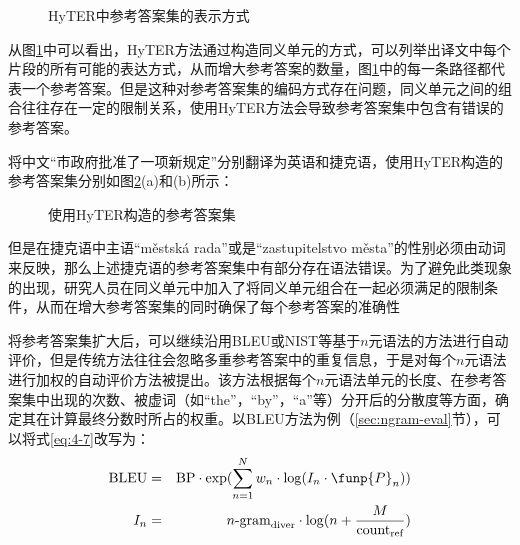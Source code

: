 \begin{figure}[htp]
    \centering
	
   \caption{HyTER中参考答案集的表示方式}
   \label{fig:4-7}
\end{figure}

\parinterval 从图\ref{fig:4-7}中可以看出，HyTER方法通过构造同义单元的方式，可以列举出译文中每个片段的所有可能的表达方式，从而增大参考答案的数量，图\ref{fig:4-7}中的每一条路径都代表一个参考答案。但是这种对参考答案集的编码方式存在问题，同义单元之间的组合往往存在一定的限制关系，使用HyTER方法会导致参考答案集中包含有错误的参考答案。

\begin{example}
将中文“市政府批准了一项新规定”分别翻译为英语和捷克语，使用HyTER构造的参考答案集分别如图\ref{fig:4-8}(a)和(b)所示：
\label{eg:4-6}
\end{example}

\begin{figure}[htp]
    \centering
{}
   \caption{使用HyTER构造的参考答案集}
   \label{fig:4-8}
\end{figure}

\parinterval 但是在捷克语中主语“městská rada”或是“zastupitelstvo města”的性别必须由动词来反映，那么上述捷克语的参考答案集中有部分存在语法错误。为了避免此类现象的出现，研究人员在同义单元中加入了将同义单元组合在一起必须满足的限制条件，从而在增大参考答案集的同时确保了每个参考答案的准确性

\parinterval 将参考答案集扩大后，可以继续沿用BLEU或NIST等基于$n$元语法的方法进行自动评价，但是传统方法往往会忽略多重参考答案中的重复信息，于是对每个$n$元语法进行加权的自动评价方法被提出。该方法根据每个$n$元语法单元的长度、在参考答案集中出现的次数、被虚词（如“the”，“by”，“a”等）分开后的分散度等方面，确定其在计算最终分数时所占的权重。以BLEU方法为例（\ref{sec:ngram-eval}节），可以将式\eqref{eq:4-7}改写为：
\begin{eqnarray}
\textrm{BLEU} &=& \textrm {BP} \cdot {\textrm{exp}}(\sum\limits_{n = 1}^N {{w_n} \cdot \log ({I}_n \cdot \funp{P}_n} ))
\label{eq:4-14}\\
{I}_n &=& n\textrm{-gram}_{\textrm {diver}} \cdot \log (n + \frac{M}{\textrm{count}_{\textrm{ref}}})
\label{eq:4-15}
\end{eqnarray}

